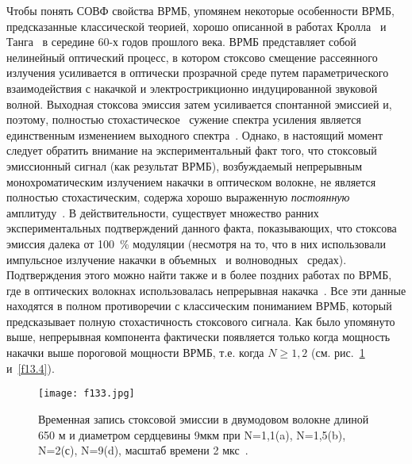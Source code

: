 Чтобы понять СОВФ свойства ВРМБ, упомянем некоторые особенности
ВРМБ, предсказанные классической теорией, хорошо описанной в работах
Кролла~\cite{1323} и Танга~\cite{1324} в середине 60-х годов
прошлого века. ВРМБ представляет собой нелинейный оптический
процесс, в котором стоксово смещение рассеянного излучения
усиливается в оптически прозрачной среде путем параметрического
взаимодействия с накачкой и электрострикционно индуцированной
звуковой волной. Выходная стоксова эмиссия затем усиливается
спонтанной эмиссией и, поэтому, полностью стохастическое~\cite{1325}
сужение спектра усиления является единственным изменением выходного
спектра~\cite{1324,1325}. Однако, в настоящий момент следует
обратить внимание на экспериментальный факт того, что стоксовый
эмиссионный сигнал (как результат ВРМБ), возбуждаемый непрерывным
монохроматическим излучением накачки в оптическом волокне, не
является полностью стохастическим, содержа хорошо выраженную
\emph{постоянную} амплитуду~\cite{1326}. В действительности,
существует множество ранних экспериментальных подтверждений данного
факта, показывающих, что стоксова эмиссия далека от 100~\% модуляции
(несмотря на то, что в них использовали импульсное излучение накачки
в объемных~\cite{1327,1328} и волноводных~\cite{1329,1330} средах).
Подтверждения этого можно найти также и в более поздних работах по
ВРМБ, где в оптических волокнах использовалась непрерывная накачка~\cite{1332,1333,1334,1335}.
Все эти данные находятся в полном
противоречии с классическим пониманием ВРМБ, который предсказывает
полную стохастичность стоксового сигнала. Как было упомянуто выше,
непрерывная компонента фактически появляется только когда мощность
накачки выше пороговой мощности ВРМБ, т.е. когда $N\geq1,2$ (см.
рис.~\ref{f13.3} и~\ref{f13.4}).
\begin{figure}
\centering
\texttt{[image: f133.jpg]}\\
\caption{Временная запись стоксовой эмиссии в двумодовом волокне
длиной 650 м и диаметром сердцевины 9мкм при N=1,1(a), N=1,5(b),
N=2(с), N=9(d), масштаб времени 2 мкс~\cite{1300}.} \label{f13.3}
\end{figure}

